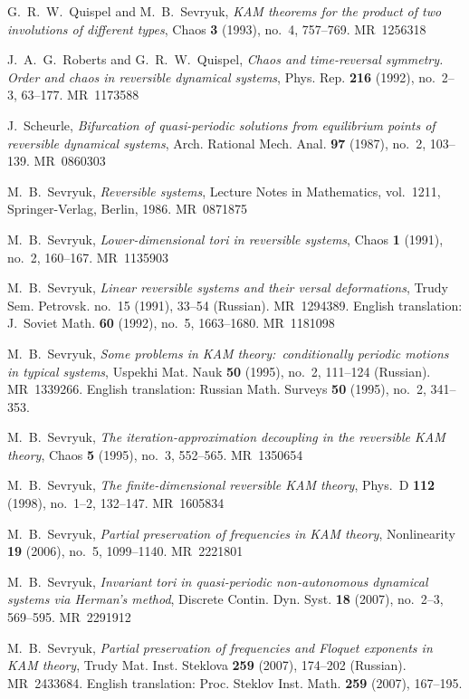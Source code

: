 \documentclass[12pt,reqno]{amsart}
\theoremstyle{definition}
\begin{document}
\begin{thebibliography}{99}
G.~R.~W.~Quispel and M.~B.~Sevryuk, \emph{KAM theorems for the product of two
involutions of different types}, Chaos \textbf{3} (1993), no.~4, 757--769.
MR~1256318

J.~A.~G.~Roberts and G.~R.~W.~Quispel, \emph{Chaos and time-reversal symmetry.
Order and chaos in reversible dynamical systems}, Phys. Rep. \textbf{216}
(1992), no.~2--3, 63--177. MR~1173588

J.~Scheurle, \emph{Bifurcation of quasi-periodic solutions from equilibrium
points of reversible dynamical systems}, Arch. Rational Mech. Anal.
\textbf{97} (1987), no.~2, 103--139. MR~0860303

M.~B.~Sevryuk, \emph{Reversible systems}, Lecture Notes in Mathematics,
vol.~1211, Springer-Verlag, Berlin, 1986. MR~0871875

M.~B.~Sevryuk, \emph{Lower-dimensional tori in reversible systems}, Chaos
\textbf{1} (1991), no.~2, 160--167. MR~1135903

M.~B.~Sevryuk, \emph{Linear reversible systems and their versal deformations},
Trudy Sem. Petrovsk. no.~15 (1991), 33--54 (Russian). MR~1294389. English
translation: J.~Soviet Math. \textbf{60} (1992), no.~5, 1663--1680. MR~1181098

M.~B.~Sevryuk, \emph{Some problems in KAM theory:\ conditionally periodic
motions in typical systems}, Uspekhi Mat. Nauk \textbf{50} (1995), no.~2,
111--124 (Russian). MR~1339266. English translation: Russian Math. Surveys
\textbf{50} (1995), no.~2, 341--353.

M.~B.~Sevryuk, \emph{The iteration-approximation decoupling in the reversible
KAM theory}, Chaos \textbf{5} (1995), no.~3, 552--565. MR~1350654

M.~B.~Sevryuk, \emph{The finite-dimensional reversible KAM theory}, Phys.~D
\textbf{112} (1998), no.~1--2, 132--147. MR~1605834

M.~B.~Sevryuk, \emph{Partial preservation of frequencies in KAM theory},
Nonlinearity \textbf{19} (2006), no.~5, 1099--1140. MR~2221801

M.~B.~Sevryuk, \emph{Invariant tori in quasi-periodic non-autonomous dynamical
systems via Herman's method}, Discrete Contin. Dyn. Syst. \textbf{18} (2007),
no.~2--3, 569--595. MR~2291912

M.~B.~Sevryuk, \emph{Partial preservation of frequencies and Floquet exponents
in KAM theory}, Trudy Mat. Inst. Steklova \textbf{259} (2007), 174--202
(Russian). MR~2433684. English translation: Proc. Steklov Inst. Math.
\textbf{259} (2007), 167--195.


\end{thebibliography}
\end{document}
